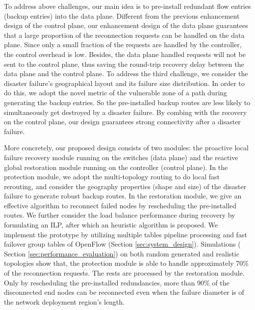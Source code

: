 \documentclass[10pt,journal]{IEEEtran}
\begin{document}
To address above challenges, our main idea is to pre-install redundant flow entries (backup entries) into the data plane. Different from the previous enhancement design of the control plane, our enhancement design of the data plane guarantees that a large proportion of the reconnection requests can be handled on the data plane. Since only a small fraction of the requests are handled by the controller, the control overhead is low. Besides, the data plane handled requests will not be sent to the control plane, thus saving the round-trip recovery delay between the data plane and the control plane. To address the third challenge, we consider the disaster failure's geographical layout and its failure size distribution. In order to do this, we adopt the novel metric of the vulnerable zone of a path during generating the backup entries. So the pre-installed backup routes are less likely to simultaneously get destroyed by a disaster failure. By combing with the recovery on the control plane, our design guarantees strong connectivity after a disaster failure.

More concretely, our proposed design consists of two modules: the proactive local failure recovery module running on the switches (data plane) and the reactive global restoration module running on the controller (control plane). In the protection module, we adopt the multi-topology routing to do local fast rerouting, and consider the geography properties (shape and size) of the disaster failure to generate robust backup routes. In the restoration module, we give an effective algorithm to reconnect failed nodes by rescheduling the pre-installed routes. We further consider the load balance performance during recovery by formulating an ILP, after which an heuristic algorithm is proposed. We implement the prototype by utilizing multiple tables pipeline processing and fast failover group tables of OpenFlow (Section \ref{sec:system_design}).
Simulations ( Section \ref{sec:performance_evaluation}) on both random generated and realistic topologies show that, the protection module is able to handle approximately 70\% of the reconnection requests. The rests are processed by the restoration module. Only by rescheduling the pre-installed redundancies, more than 90\% of the disconnected end nodes can be reconnected even when the failure diameter is  of the network deployment region's length.
\end{document}
